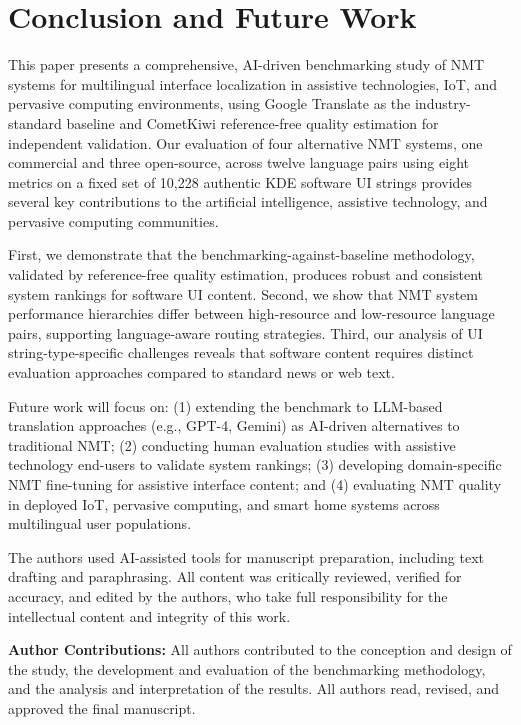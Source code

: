 \documentclass[Afour,sagev,times,doublespace]{sagej}
\begin{document}
\section{Conclusion and Future Work}

This paper presents a comprehensive, AI-driven benchmarking study of NMT systems for multilingual interface localization in assistive technologies, IoT, and pervasive computing environments, using Google Translate as the industry-standard baseline and CometKiwi reference-free quality estimation for independent validation. Our evaluation of four alternative NMT systems, one commercial and three open-source, across twelve language pairs using eight metrics on a fixed set of 10,228 authentic KDE software UI strings provides several key contributions to the artificial intelligence, assistive technology, and pervasive computing communities.

First, we demonstrate that the benchmarking-against-baseline methodology, validated by reference-free quality estimation, produces robust and consistent system rankings for software UI content. Second, we show that NMT system performance hierarchies differ between high-resource and low-resource language pairs, supporting language-aware routing strategies. Third, our analysis of UI string-type-specific challenges reveals that software content requires distinct evaluation approaches compared to standard news or web text.

Future work will focus on: (1) extending the benchmark to LLM-based translation approaches (e.g., GPT-4, Gemini) as AI-driven alternatives to traditional NMT; (2) conducting human evaluation studies with assistive technology end-users to validate system rankings; (3) developing domain-specific NMT fine-tuning for assistive interface content; and (4) evaluating NMT quality in deployed IoT, pervasive computing, and smart home systems across multilingual user populations.

\begin{acks}
The authors used AI-assisted tools for manuscript preparation, including text drafting and paraphrasing. All content was critically reviewed, verified for accuracy, and edited by the authors, who take full responsibility for the intellectual content and integrity of this work.
\end{acks}

\noindent\textbf{Author Contributions:} All authors contributed to the conception and design of the study, the development and evaluation of the benchmarking methodology, and the analysis and interpretation of the results. All authors read, revised, and approved the final manuscript.
\end{document}
